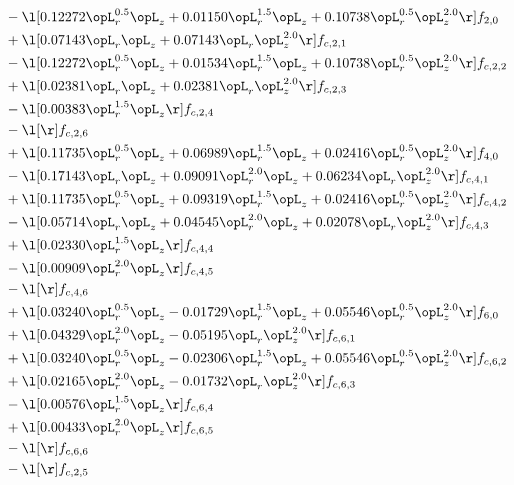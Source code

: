 \begin{alignat}{2}
& - \l[  0.12272 \opL_r^{0.5} \opL_z +  0.01150 \opL_r^{1.5} \opL_z +  0.10738 \opL_r^{0.5} \opL_z^{2.0}  \r] f_{2,0} \nonumber \\ 
& + \l[  0.07143 \opL_r \opL_z +  0.07143 \opL_r \opL_z^{2.0}  \r] f_{c,2,1} \nonumber \\ 
& - \l[  0.12272 \opL_r^{0.5} \opL_z +  0.01534 \opL_r^{1.5} \opL_z +  0.10738 \opL_r^{0.5} \opL_z^{2.0}  \r] f_{c,2,2} \nonumber \\ 
& + \l[  0.02381 \opL_r \opL_z +  0.02381 \opL_r \opL_z^{2.0}  \r] f_{c,2,3} \nonumber \\ 
& - \l[  0.00383 \opL_r^{1.5} \opL_z  \r] f_{c,2,4} \nonumber \\ 
& - \l[  \r] f_{c,2,6} \nonumber \\ 
& + \l[  0.11735 \opL_r^{0.5} \opL_z +  0.06989 \opL_r^{1.5} \opL_z +  0.02416 \opL_r^{0.5} \opL_z^{2.0}  \r] f_{4,0} \nonumber \\ 
& - \l[  0.17143 \opL_r \opL_z +  0.09091 \opL_r^{2.0} \opL_z +  0.06234 \opL_r \opL_z^{2.0}  \r] f_{c,4,1} \nonumber \\ 
& + \l[  0.11735 \opL_r^{0.5} \opL_z +  0.09319 \opL_r^{1.5} \opL_z +  0.02416 \opL_r^{0.5} \opL_z^{2.0}  \r] f_{c,4,2} \nonumber \\ 
& - \l[  0.05714 \opL_r \opL_z +  0.04545 \opL_r^{2.0} \opL_z +  0.02078 \opL_r \opL_z^{2.0}  \r] f_{c,4,3} \nonumber \\ 
& + \l[  0.02330 \opL_r^{1.5} \opL_z  \r] f_{c,4,4} \nonumber \\ 
& - \l[  0.00909 \opL_r^{2.0} \opL_z  \r] f_{c,4,5} \nonumber \\ 
& - \l[  \r] f_{c,4,6} \nonumber \\ 
& + \l[  0.03240 \opL_r^{0.5} \opL_z   -0.01729 \opL_r^{1.5} \opL_z +  0.05546 \opL_r^{0.5} \opL_z^{2.0}  \r] f_{6,0} \nonumber \\ 
& + \l[  0.04329 \opL_r^{2.0} \opL_z   -0.05195 \opL_r \opL_z^{2.0}  \r] f_{c,6,1} \nonumber \\ 
& + \l[  0.03240 \opL_r^{0.5} \opL_z   -0.02306 \opL_r^{1.5} \opL_z +  0.05546 \opL_r^{0.5} \opL_z^{2.0}  \r] f_{c,6,2} \nonumber \\ 
& + \l[  0.02165 \opL_r^{2.0} \opL_z   -0.01732 \opL_r \opL_z^{2.0}  \r] f_{c,6,3} \nonumber \\ 
& - \l[  0.00576 \opL_r^{1.5} \opL_z  \r] f_{c,6,4} \nonumber \\ 
& + \l[  0.00433 \opL_r^{2.0} \opL_z  \r] f_{c,6,5} \nonumber \\ 
& - \l[  \r] f_{c,6,6} \nonumber \\ 
& - \l[  \r] f_{c,2,5} \nonumber \\ 
\end{alignat} 


